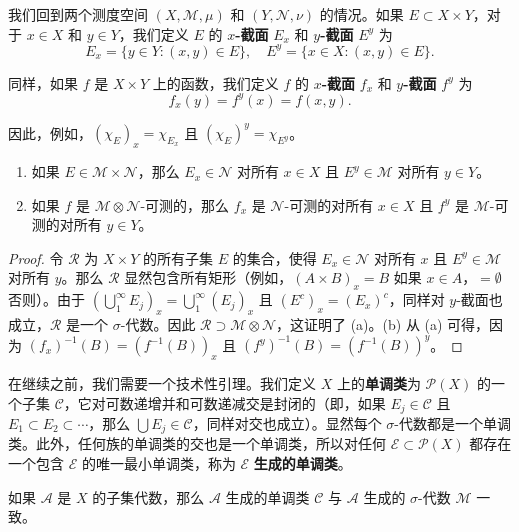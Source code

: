 \documentclass[lang=cn,10pt,thmcnt=section]{elegantbook}
\begin{document}
我们回到两个测度空间 $(X, \mathcal{M}, \mu)$ 和 $(Y, \mathcal{N}, \nu)$ 的情况。如果 $E \subset X \times Y$，对于 $x \in X$ 和 $y \in Y$，我们定义 $E$ 的 $x$\textbf{-截面} $E_x$ 和 $y$\textbf{-截面} $E^y$ 为
\[ E_x = \{y \in Y : (x, y) \in E\}, \quad E^y = \{x \in X : (x, y) \in E\}. \]

同样，如果 $f$ 是 $X \times Y$ 上的函数，我们定义 $f$ 的 $x$\textbf{-截面} $f_x$ 和 $y$\textbf{-截面} $f^y$ 为
\[ f_x(y) = f^y(x) = f(x, y). \]

因此，例如，$(\chi_E)_x = \chi_{E_x}$ 且 $(\chi_E)^y = \chi_{E^y}$。

\begin{proposition}\label{proposition2.34}
\begin{enumerate}[label=\alph*.]
\item 如果 $E \in \mathcal{M} \times \mathcal{N}$，那么 $E_x \in \mathcal{N}$ 对所有 $x \in X$ 且 $E^y \in \mathcal{M}$ 对所有 $y \in Y$。
\item 如果 $f$ 是 $\mathcal{M} \otimes \mathcal{N}$-可测的，那么 $f_x$ 是 $\mathcal{N}$-可测的对所有 $x \in X$ 且 $f^y$ 是 $\mathcal{M}$-可测的对所有 $y \in Y$。
\end{enumerate}
\end{proposition}

\begin{proof}
令 $\mathcal{R}$ 为 $X \times Y$ 的所有子集 $E$ 的集合，使得 $E_x \in \mathcal{N}$ 对所有 $x$ 且 $E^y \in \mathcal{M}$ 对所有 $y$。那么 $\mathcal{R}$ 显然包含所有矩形（例如，$(A \times B)_x = B$ 如果 $x \in A$，$= \emptyset$ 否则）。由于 $(\bigcup_1^\infty E_j)_x = \bigcup_1^\infty (E_j)_x$ 且 $(E^c)_x = (E_x)^c$，同样对 $y$-截面也成立，$\mathcal{R}$ 是一个 $\sigma$-代数。因此 $\mathcal{R} \supset \mathcal{M} \otimes \mathcal{N}$，这证明了 (a)。(b) 从 (a) 可得，因为 $(f_x)^{-1}(B) = (f^{-1}(B))_x$ 且 $(f^y)^{-1}(B) = (f^{-1}(B))^y$。
\end{proof}

在继续之前，我们需要一个技术性引理。我们定义 $X$ 上的\textbf{单调类}为 $\mathcal{P}(X)$ 的一个子集 $\mathcal{C}$，它对可数递增并和可数递减交是封闭的（即，如果 $E_j \in \mathcal{C}$ 且 $E_1 \subset E_2 \subset \cdots$，那么 $\bigcup E_j \in \mathcal{C}$，同样对交也成立）。显然每个 $\sigma$-代数都是一个单调类。此外，任何族的单调类的交也是一个单调类，所以对任何 $\mathcal{E} \subset \mathcal{P}(X)$ 都存在一个包含 $\mathcal{E}$ 的唯一最小单调类，称为 $\mathcal{E}$ \textbf{生成的单调类}。

\begin{theorem}[单调类引理]\label{theorem2.35}
如果 $\mathcal{A}$ 是 $X$ 的子集代数，那么 $\mathcal{A}$ 生成的单调类 $\mathcal{C}$ 与 $\mathcal{A}$ 生成的 $\sigma$-代数 $\mathcal{M}$ 一致。
\end{theorem}
\end{document}
